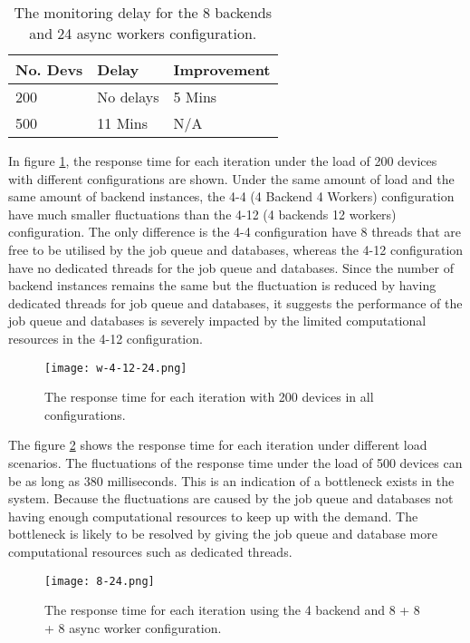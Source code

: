 \documentclass[../thesis.tex]{subfiles}
\begin{document}
\begin{table}[h!]
\begin{center}
\caption{The monitoring delay for the 8 backends and 24 async workers configuration.}
\label{tab:delay8-24}
\begin{tabular}{l|l|l}
\toprule
\textbf{No. Devs} & \textbf{Delay} & \textbf{Improvement}\\
\midrule
200 & No delays & 5 Mins	\\
500 & 11 Mins & N/A\\
\bottomrule
\end{tabular}
\end{center}
\end{table}



In figure \ref{fig:w-4-12-24}, the response time for each iteration under the load of 200 devices with different configurations are shown. Under the same amount of load and the same amount of backend instances, the 4-4 (4 Backend 4 Workers) configuration have much smaller fluctuations than the 4-12 (4 backends 12 workers) configuration. The only difference is the 4-4 configuration have 8 threads that are free to be utilised by the job queue and databases, whereas the 4-12 configuration have no dedicated threads for the job queue and databases. Since the number of backend instances remains the same but the fluctuation is reduced by having dedicated threads for job queue and databases, it suggests the performance of the job queue and databases is severely impacted by the limited computational resources in the 4-12 configuration.

\begin{figure}[!ht]
\centering
\texttt{[image: w-4-12-24.png]}
\caption{The response time for each iteration with 200 devices in all configurations.}
\label{fig:w-4-12-24}
\end{figure}


The figure \ref{fig:8-24} shows the response time for each iteration under different load scenarios. The fluctuations of the response time under the load of 500 devices can be as long as 380 milliseconds. This is an indication of a bottleneck exists in the system. Because the fluctuations are caused by the job queue and databases not having enough computational resources to keep up with the demand. The bottleneck is likely to be resolved by giving the job queue and database more computational resources such as dedicated threads.

\begin{figure}[!ht]
\centering
\texttt{[image: 8-24.png]}
\caption{The response time for each iteration using the 4 backend and 8 + 8 + 8 async worker configuration.}
\label{fig:8-24}
\end{figure}
\end{document}
